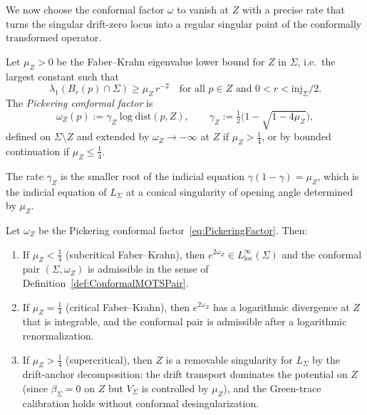 We now choose the conformal factor $\omega$ to vanish at $Z$ with a precise rate that turns the singular drift-zero locus into a regular singular point of the conformally transformed operator.

\begin{definition}\label{def:PickeringConformalFactor}
Let $\mu_Z>0$ be the Faber--Krahn eigenvalue lower bound for $Z$ in $\Sigma$, i.e.\ the largest constant such that
\[
    \lambda_1(B_r(p)\cap\Sigma)\ge\mu_Z\,r^{-2}
    \quad\text{for all }p\in Z\text{ and }0<r<\mathrm{inj}_\Sigma/2.
\]
The \emph{Pickering conformal factor} is
\begin{equation}\label{eq:PickeringFactor}
    \omega_Z(p):=\gamma_Z\log\mathrm{dist}(p,Z),
    \qquad
    \gamma_Z:=\tfrac{1}{2}\bigl(1-\sqrt{1-4\mu_Z}\bigr),
\end{equation}
defined on $\Sigma\setminus Z$ and extended by $\omega_Z\to-\infty$ at $Z$ if $\mu_Z>\tfrac14$, or by bounded continuation if $\mu_Z\le\tfrac14$.
\end{definition}

The rate $\gamma_Z$ is the smaller root of the indicial equation $\gamma(1-\gamma)=\mu_Z$, which is the indicial equation of $L_\Sigma$ at a conical singularity of opening angle determined by $\mu_Z$.

\begin{lemma}\label{lem:IndicialRegularity}
Let $\omega_Z$ be the Pickering conformal factor~\eqref{eq:PickeringFactor}. Then:
\begin{enumerate}
    \item If $\mu_Z<\tfrac14$ (subcritical Faber--Krahn), then $e^{2\omega_Z}\in L^\infty_{\mathrm{loc}}(\Sigma)$ and the conformal pair $(\Sigma,\omega_Z)$ is admissible in the sense of Definition~\ref{def:ConformalMOTSPair}.
    \item If $\mu_Z=\tfrac14$ (critical Faber--Krahn), then $e^{2\omega_Z}$ has a logarithmic divergence at $Z$ that is integrable, and the conformal pair is admissible after a logarithmic renormalization.
    \item If $\mu_Z>\tfrac14$ (supercritical), then $Z$ is a removable singularity for $L_\Sigma$ by the drift-anchor decomposition: the drift transport dominates the potential on $Z$ (since $\beta_\Sigma=0$ on $Z$ but $V_\Sigma$ is controlled by $\mu_Z$), and the Green-trace calibration holds without conformal desingularization.
\end{enumerate}
\end{lemma}

